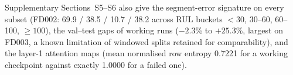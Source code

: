 Supplementary Sections~S5--S6 also give the segment-error signature on every
subset (FD002: 69.9 / 38.5 / 10.7 / 38.2 across RUL buckets $<30$, 30--60,
60--100, $\geq100$), the val--test gaps of working runs ($-2.3$\% to
$+25.3$\%, largest on FD003, a known limitation of windowed splits retained
for comparability), and the layer-1 attention maps (mean normalised row
entropy 0.7221 for a working checkpoint against exactly 1.0000 for a failed
one).
